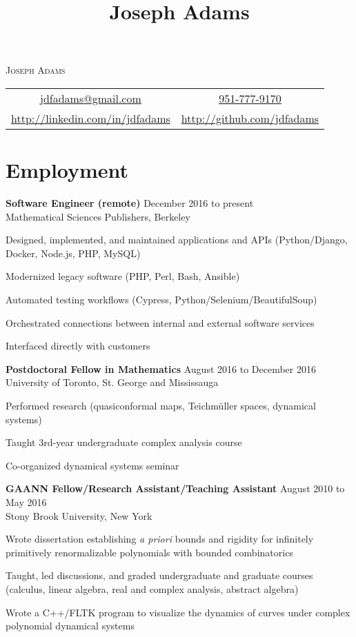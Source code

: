 \documentclass[11pt]{article}
\title{Joseph Adams}
\makeatletter
\newcommand\email{jdfadams@gmail.com}
\newcommand\phone{951-777-9170}
\makeatother
\begin{document}

\begin{center}
\textsc{\Large Joseph Adams} \\[1.5\baselineskip]
\begin{tabular}{c c}
\href{mailto:\email}{\email} & \href{tel:1-\phone}{\phone} \\
\url{http://linkedin.com/in/jdfadams} & \url{http://github.com/jdfadams}
\end{tabular}
\end{center}

\section*{Employment}
\noindent\textbf{Software Engineer (remote)} \hfill December 2016 to present\\
Mathematical Sciences Publishers, Berkeley\\
\begin{inparaitem}
\item Designed, implemented, and maintained applications and APIs (Python/Django, Docker, Node.js, PHP, MySQL)
\item Modernized legacy software (PHP, Perl, Bash, Ansible)
\item Automated testing workflows (Cypress, Python/Selenium/BeautifulSoup)
\item Orchestrated connections between internal and external software services
\item Interfaced directly with customers
\end{inparaitem}

\noindent\textbf{Postdoctoral Fellow in Mathematics} \hfill August 2016 to December 2016\\
University of Toronto, St. George and Mississauga\\
\begin{inparaitem}
\item Performed research (quasiconformal maps, Teichm\"{u}ller spaces, dynamical systems)
\item Taught 3rd-year undergraduate complex analysis course
\item Co-organized dynamical systems seminar
\end{inparaitem}

\noindent\textbf{GAANN Fellow/Research Assistant/Teaching Assistant} \hfill August 2010 to May 2016\\
Stony Brook University, New York
\begin{inparaitem}
\item Wrote dissertation establishing \textit{a priori} bounds and rigidity for infinitely primitively renormalizable polynomials with bounded combinatorics
\item Taught, led discussions, and graded undergraduate and graduate courses (calculus, linear algebra, real and complex analysis, abstract algebra)
\item Wrote a C++/FLTK program to visualize the dynamics of curves under complex polynomial dynamical systems
\end{inparaitem}
\end{document}
